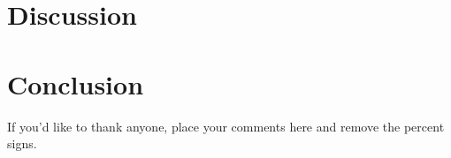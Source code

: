 \section{Discussion}\label{sec:discussions}


\section{Conclusion}\label{sec:conclusions}




\begin{acknowledgements}
If you'd like to thank anyone, place your comments here
and remove the percent signs.
\end{acknowledgements}





